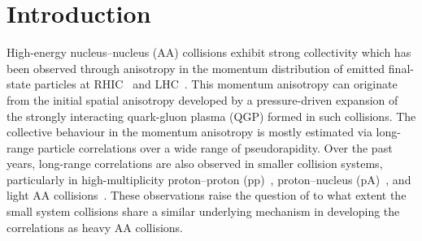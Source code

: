 
\section{Introduction}
\label{sec:intro}

High-energy nucleus--nucleus (AA) collisions exhibit strong collectivity which has been observed through anisotropy in the momentum distribution of emitted final-state particles at RHIC~\cite{Adams:2005dq,Adcox:2004mh,Arsene:2004fa,Back:2004je} and LHC~\cite{Abelev:2012di, Abelev:2014pua, ATLAS:2011ah}. This momentum anisotropy can originate from the initial spatial anisotropy developed by a pressure-driven expansion of the strongly interacting quark-gluon plasma (QGP) formed in such collisions.
The collective behaviour in the momentum anisotropy is mostly estimated via long-range particle correlations over a wide range of pseudorapidity. Over the past years, long-range correlations are also observed in smaller collision systems, particularly in high-multiplicity proton--proton (pp)~\cite{ATLAS:2015hzw,Khachatryan:2015lva,Khachatryan:2016txc,Acharya:2019vdf,ATLAS:2017rtr}, proton--nucleus (pA)~\cite{ALICE:2012eyl,ATLAS:2014qaj,ATLAS:2016yzd,Khachatryan:2016ibd}, and light AA collisions~\cite{PHENIX:2018lia,Aidala:2017ajz}. These observations raise the question of to what extent the small system collisions share a similar underlying mechanism in developing the correlations as heavy AA collisions.

